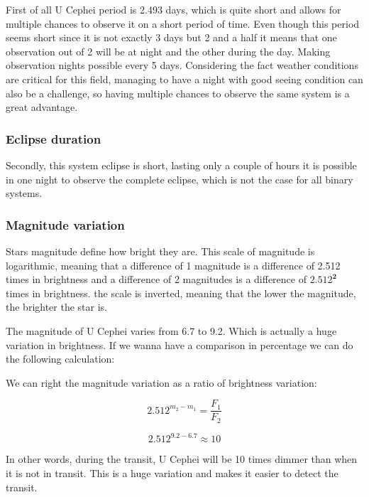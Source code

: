 \documentclass[12pt,a4paper]{article}
\begin{document}
First of all U Cephei period is 2.493 days, which is quite short and allows for multiple chances to observe it on a short period of time. 
Even though this period seems short since it is not exactly 3 days but 2 and a half it means that one observation out of 2 will be at night and the other during the day.
Making observation nights possible every 5 days.
Considering the fact weather conditions are critical for this field, managing to have a night with good seeing condition can also be a challenge, so having multiple chances to observe the same system is a great advantage.

\subsubsection{Eclipse duration}

Secondly, this system eclipse is short, lasting only a couple of hours it is possible in one night to observe the complete eclipse, which is not the case for all binary systems.

\subsubsection{Magnitude variation}

Stars magnitude define how bright they are. This scale of magnitude is logarithmic, meaning that a difference of 1 magnitude is a difference of 2.512 times in brightness and a difference of 2 magnitudes is a difference of \(\mathbf{2.512^2}\) times in brightness.
the scale is inverted, meaning that the lower the magnitude, the brighter the star is.

The magnitude of U Cephei varies from 6.7 to 9.2. Which is actually a huge variation in brightness. If we wanna have a comparison in percentage we can do the following calculation:

We can right the magnitude variation as a ratio of brightness variation:

\begin{equation}
     2.512^{m_2-m_1} = \frac{F_1}{F_2}
\end{equation}

\begin{equation}
    2.512^{9.2-6.7} \approx 10
\end{equation}

In other words, during the transit, U Cephei will be 10 times dimmer than when it is not in transit. This is a huge variation and makes it easier to detect the transit.
\end{document}

